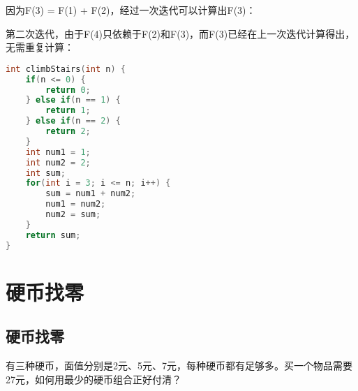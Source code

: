 因为F(3) = F(1) + F(2)，经过一次迭代可以计算出F(3)：

\begin{table}[H]
	\centering
\end{table}

第二次迭代，由于F(4)只依赖于F(2)和F(3)，而F(3)已经在上一次迭代计算得出，无需重复计算：

\begin{table}[H]
	\centering
\end{table}


\begin{lstlisting}[language=C]
int climbStairs(int n) {
    if(n <= 0) {
        return 0;
    } else if(n == 1) {
        return 1;
    } else if(n == 2) {
        return 2;
    }
    int num1 = 1;
    int num2 = 2;
    int sum;
    for(int i = 3; i <= n; i++) {
        sum = num1 + num2;
        num1 = num2;
        num2 = sum;
    }
    return sum;
}
\end{lstlisting}

\newpage

\section{硬币找零}

\subsection{硬币找零}

有三种硬币，面值分别是2元、5元、7元，每种硬币都有足够多。买一个物品需要27元，如何用最少的硬币组合正好付清？ \\

